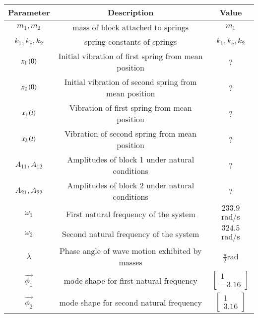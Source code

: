 \begin{tabular}{|c|c|c|}
    \hline
    \textbf{Parameter} & \textbf{Description} & \textbf{Value} \\
    \hline
    $m_1,m_2$ & mass of block attached to springs& $ m_1$\\
    \hline
    $k_1,k_c,k_2$ & spring constants of springs& $ k_1,k_c,k_2$\\
    \hline
    $x_1\left(0\right)$ & Initial vibration of first spring from mean position& ? \\
    \hline
    $x_2\left(0\right)$ & Initial vibration of second spring from mean position & ? \\
    \hline
    $x_1\left(t\right)$ & Vibration of first spring from mean position& ? \\
    \hline
    $x_2\left(t\right)$ & Vibration of second spring from mean position & ? \\
    \hline
    $A_{11},A_{12}$ & Amplitudes of block 1 under natural conditions& ?\\
    \hline
    $A_{21},A_{22}$ & Amplitudes of block 2 under natural conditions& ?\\
    \hline
    $\omega_1$ & First natural frequency of the system& $ 233.9$ rad/s\\
    \hline
    $\omega_2$ & Second natural frequency of the system &$ 324.5$ rad/s \\
    \hline
    $\lambda$ & Phase angle of wave motion exhibited by masses&$ \frac{\pi}{2} $rad\\
    \hline
    $\vec{\phi_1}$ & mode shape for first natural frequency& $ \begin{bmatrix}
1\\
-3.16
\end{bmatrix}$\\
    \hline
    $\vec{\phi_2}$ & mode shape for second natural frequency& $ \begin{bmatrix}
1\\
3.16
\end{bmatrix}$\\
    \hline
\end{tabular}





